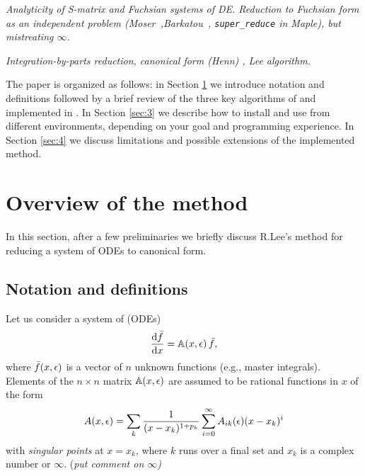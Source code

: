 \documentclass[12pt,a4paper]{article}
\def\M#1{\mathbb{#1}} %
\begin{document}
{\it Analyticity of S-matrix and Fuchsian systems of DE. Reduction to Fuchsian form as an independent problem (Moser~\cite{Mos59},Barkatou~\cite{BP09}, \texttt{super\_reduce} in Maple), but mistreating $\infty$.}

{\it Integration-by-parts reduction, canonical form (Henn) \cite{Henn13}, Lee algorithm.}

The paper is organized as follows: in Section \ref{sec:2} we introduce notation and definitions followed by a brief review of the three key algorithms of \cite{Lee15} and implemented in \fuchsia.
In Section \ref{sec:3} we describe how to install and use \fuchsia from different environments, depending on your goal and programming experience.
In Section \ref{sec:4} we discuss limitations and possible extensions of the implemented method.


\section{Overview of the method}
\label{sec:2}

In this section, after a few preliminaries we briefly discuss R.Lee's method for reducing a system of ODEs to canonical form.


\subsection{Notation and definitions}

Let us consider a system of (ODEs)
\begin{equation}
\label{eq:df}
  \frac{\D \bar{f}}{\D x} = \M A(x,\eps)\,\bar{f},
\end{equation}
where $\bar{f}(x,\epsilon)$ is a vector of $n$ unknown functions (e.g., master integrals).
Elements of the $n \times n$ matrix  $\M A(x,\eps)$ are assumed to be rational functions in $x$ of the form
\begin{equation}
\label{eq:axeps}
  A(x,\epsilon) = \sum_k \frac{1}{(x-x_k)^{1+p_k}} \sum_{i=0}^\infty A_{ik}(\epsilon) (x-x_k)^i
\end{equation}
with {\em singular points} at $x = x_k$, where $k$ runs over a final set and $x_k$ is a complex number or $\infty$.
{(\em put comment on $\infty$)}
\end{document}
